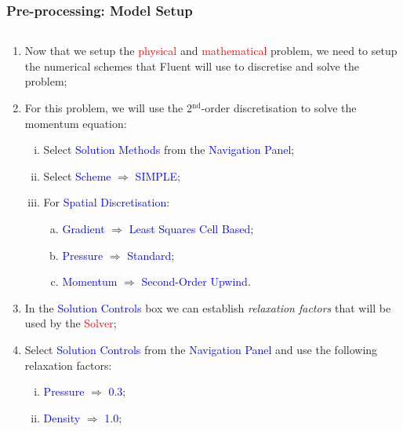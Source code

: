 \documentclass[10pt,compress, unknownkeysallowed]{beamer}
\newcommand{\red}{\textcolor{red}}
\newcommand{\blue}{\textcolor{blue}}
\begin{document}
\begin{frame}
  \frametitle{Pre-processing: Model Setup}
    \begin{columns}
        \begin{column}[l]{0.5\linewidth}
           \begin{enumerate}\scriptsize\setcounter{enumi}{13}
                \item<1-> Now that we setup the \red{physical} and \red{mathematical} problem, we need to setup the numerical schemes that Fluent will use to discretise and solve the problem;
                \item<2-> For this problem, we will use the 2$^{\text{nd}}$-order discretisation to solve the momentum equation:
                    \begin{enumerate}[i)]\scriptsize
                        \item<2-> Select \blue{Solution Methods} from the \blue{Navigation Panel};
                        \item<2-> Select \blue{Scheme} $\Rightarrow$ \blue{SIMPLE};
                        \item<2-> For \blue{Spatial Discretisation}:
                             \begin{enumerate}[(a)]\scriptsize
                                       \item<2-> \blue{Gradient} $\Rightarrow$ \blue{Least Squares Cell Based};
                                       \item<2-> \blue{Pressure} $\Rightarrow$ \blue{Standard};
                                       \item<2-> \blue{Momentum} $\Rightarrow$ \blue{Second-Order Upwind}.
                             \end{enumerate}
                    \end{enumerate}
                \item<3-> In the \blue{Solution Controls} box we can establish {\it relaxation factors} that will be used by the \red{Solver};
                \item<3-> Select \blue{Solution Controls} from the \blue{Navigation Panel} and use the following relaxation factors:
                    \begin{enumerate}[i)]\scriptsize
                        \item<3-> \blue{Pressure} $\Rightarrow$ \blue{0.3};
                        \item<3-> \blue{Density} $\Rightarrow$ \blue{1.0};

\end{enumerate}
\end{enumerate}
\end{column}
\end{columns}
\end{frame}
\end{document}
